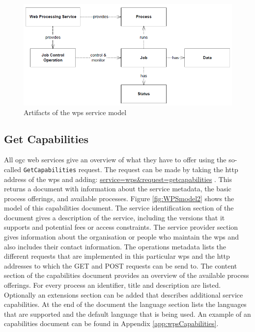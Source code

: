 \begin{figure}
	\centering
	\includegraphics[width=1\linewidth]{UML/WPSmodel.png}
	\caption{Artifacts of the \acf*{wps} service model \citep[p. 15]{GEO:OGC}}
	\label{fig:WPSmodel}
\end{figure}

\subsection{Get Capabilities}
\begin{sloppypar}
	All \ac{ogc} web services give an overview of what they have to offer using the so-called \texttt{GetCapabilities} request. The request can be made by taking the \ac{http} address of the \ac{wps} and adding: \url{service=wps&request=getcapabilities} . This returns a document with information about the service metadata, the basic process offerings, and available processes. Figure \ref{fig:WPSmodel2} shows the model of this capabilities document. The service identification section of the document gives a description of the service, including the versions that it supports and potential fees or access constraints. The service provider section gives information about the organisation or people who maintain the \ac{wps} and also includes their contact information. The operations metadata lists the different requests that are implemented in this particular \ac{wps} and the \ac{http} addresses to which the GET and POST requests can be send to. The content section of the capabilities document provides an overview of the available process offerings. For every process an identifier, title and description are listed. Optionally an extensions section can be added that describes additional service capabilities. At the end of the document the language section lists the languages that are supported and the default language that is being used. An example of an capabilities document can be found in Appendix \ref{app:wpsCapabilities}. 
\end{sloppypar}

